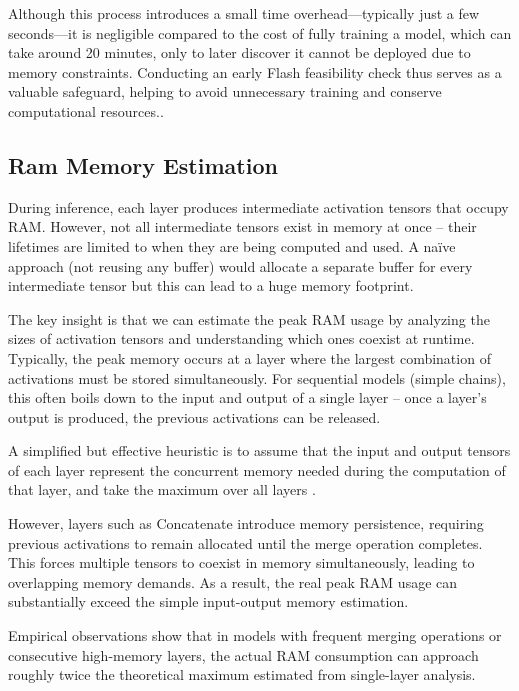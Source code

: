 Although this process introduces a small time overhead—typically just a few seconds—it is negligible compared to the cost of fully training a model, which can take around 20 minutes, only to later discover it cannot be deployed due to memory constraints. Conducting an early Flash feasibility check thus serves as a valuable safeguard, helping to avoid unnecessary training and conserve computational resources..

\clearpage

\subsection{Ram Memory Estimation}

During inference, each layer produces intermediate activation tensors that occupy RAM. However, not all intermediate tensors exist in memory at once – their lifetimes are limited to when they are being computed and used. A naïve approach (not reusing any buffer) would allocate a separate buffer for every intermediate tensor but this can lead to a huge memory footprint. \cite{tensorflow_RamEstimation} 


The key insight is that we can estimate the peak RAM usage by analyzing the sizes of activation tensors and understanding which ones coexist at runtime. Typically, the peak memory occurs at a layer where the largest combination of activations must be stored simultaneously. For sequential models (simple chains), this often boils down to the input and output of a single layer – once a layer’s output is produced, the previous activations can be released. \cite{liberis2019neural}

 A simplified but effective heuristic is to assume that the input and output tensors of each layer represent the concurrent memory needed during the computation of that layer, and take the maximum over all layers \cite{tensorflow_RamEstimation}. 

However, layers such as Concatenate introduce memory persistence, requiring previous activations to remain allocated until the merge operation completes. This forces multiple tensors to coexist in memory simultaneously, leading to overlapping memory demands. As a result, the real peak RAM usage can substantially exceed the simple input-output memory estimation. 


Empirical observations show that in models with frequent merging operations or consecutive high-memory layers, the actual RAM consumption can approach roughly twice the theoretical maximum estimated from single-layer analysis.

